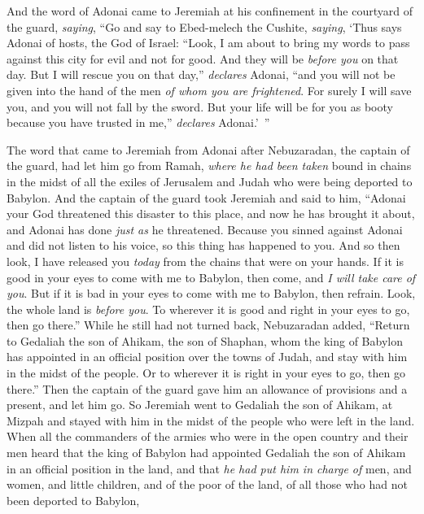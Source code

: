 \begin{biblechapter}
 And the word of Adonai came to Jeremiah at his confinement in the courtyard of the guard, \textit{saying},
\verse “Go and say to Ebed-melech the Cushite, \textit{saying}, ‘Thus says Adonai of hosts, the God of Israel: “Look, I am about to bring my words to pass against this city for evil and not for good. And they will be \textit{before you} on that day.
\verse But I will rescue you on that day,” \textit{declares} Adonai, “and you will not be given into the hand of the men \textit{of whom you are frightened}.
\verse For surely I will save you, and you will not fall by the sword. But your life will be for you as booty because you have trusted in me,” \textit{declares} Adonai.’ ”
\end{biblechapter}

\begin{biblechapter} %
 The word that came to Jeremiah from Adonai after Nebuzaradan, the captain of the guard, had let him go from Ramah, \textit{where he had been taken} bound in chains in the midst of all the exiles of Jerusalem and Judah who were being deported to Babylon.
\verse And the captain of the guard took Jeremiah and said to him, “Adonai your God threatened this disaster to this place,
\verse and now he has brought it about, and Adonai has done \textit{just as} he threatened. Because you sinned against Adonai and did not listen to his voice, so this thing has happened to you.
\verse And so then look, I have released you \textit{today} from the chains that were on your hands. If it is good in your eyes to come with me to Babylon, then come, and \textit{I will take care of you}. But if it is bad in your eyes to come with me to Babylon, then refrain. Look, the whole land is \textit{before you}. To wherever it is good and right in your eyes to go, then go there.”
\verse While he still had not turned back, Nebuzaradan added, “Return to Gedaliah the son of Ahikam, the son of Shaphan, whom the king of Babylon has appointed in an official position over the towns of Judah, and stay with him in the midst of the people. Or to wherever it is right in your eyes to go, then go there.” Then the captain of the guard gave him an allowance of provisions and a present, and let him go.
\verse So Jeremiah went to Gedaliah the son of Ahikam, at Mizpah and stayed with him in the midst of the people who were left in the land.
 When all the commanders of the armies who were in the open country and their men heard that the king of Babylon had appointed Gedaliah the son of Ahikam in an official position in the land, and that \textit{he had put him in charge of} men, and women, and little children, and of the poor of the land, of all those who had not been deported to Babylon,

\end{biblechapter}
